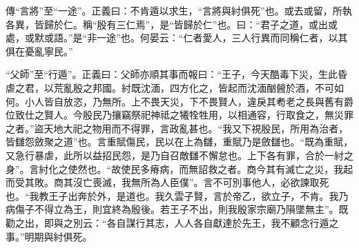{\noindent\zhuan{}\fzbyks 傳“言將”至“一途”。正義曰：不肯遁以求生，“言將與紂俱死”也。或去或留，所執各異，皆歸於仁。稱“殷有三仁焉”，是“皆歸於仁”也。曰：“君子之道，或出或處，或默或語。”是“非一途”也。何晏云：“仁者愛人，三人行異而同稱仁者，以其俱在憂亂寧民。” \par}

{\noindent\shu{}\fzkt “父師”至“行遁”。正義曰：父師亦順其事而報曰：“王子，今天酷毒下災，生此昏虐之君，以荒亂殷之邦國。紂既沈湎，四方化之，皆起而沈湎酗醟於酒，不可如何。小人皆自放恣，乃無所。上不畏天災，下不畏賢人，違戾其耇老之長與舊有爵位致仕之賢人。今殷民乃攘竊祭祀神祗之犧牷牲用，以相通容，行取食之，無災罪之者。”盜天地大祀之物用而不得罪，言政亂甚也。“我又下視殷民，所用為治者，皆讎怨斂聚之道”也。言重賦傷民，民以在上為讎，重賦乃是斂讎也。“既為重賦，又急行暴虐，此所以益招民怨，是乃自召敵讎不懈怠也。上下各有罪，合於一紂之身”。言紂化之使然也。“故使民多瘠病，而無詔救之者。商今其有滅亡之災，我起而受其敗。商其沒亡喪滅，我無所為人臣僕”。言不可別事他人，必欲諫取死也。“我教王子出奔於外，是道也。我久雲子賢，言於帝乙，欲立子，不肯。我乃病傷子不得立為王，則宜終為殷後。若王子不出，則我殷家宗廟乃隕墜無主”。既勸之出，即與之別云：“各自謀行其志，人人各自獻達於先王，我不顧念行遁之事。”明期與紂俱死。 \par}

